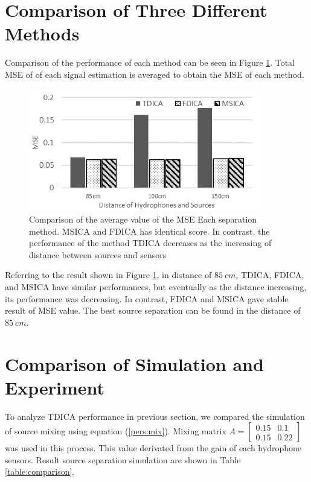 \documentclass[a4paper]{jpconf}
\begin{document}

\section{Comparison of Three Different Methods}
Comparison of the performance of each method can be seen in Figure \ref{pict:mseComparison}. Total MSE of of each signal estimation is averaged to obtain the MSE of each method.

\begin{figure}[h]
\begin{center}
\includegraphics[width=4in]{mseComparison.png}
\end{center}
\caption{\label{pict:mseComparison}Comparison of the average value of the MSE Each separation method. MSICA and FDICA has identical score. In contrast, the performance of the method TDICA decreases as the increasing of distance between sources and sensors}
\end{figure}

Referring to the result shown in Figure \ref{pict:mseComparison}, in distance of $85~cm$, TDICA, FDICA, and MSICA have similar performances, but eventually as the distance increasing, its performance was decreasing. In contrast, FDICA and MSICA gave stable result of MSE value. The best source separation can be found in the distance of $85~cm$.

\section{Comparison of Simulation and Experiment}
To analyze TDICA performance in previous section, we compared the simulation of source mixing using equation (\ref{pers:mix}). Mixing matrix $A = \begin{bmatrix}0.15 & 0.1 \\ 0.15 & 0.22\end{bmatrix}$ was used in this process. This value derivated from the gain of each hydrophone sensors. Result source separation simulation are shown in Table \ref{table:comparison}.
\end{document}
